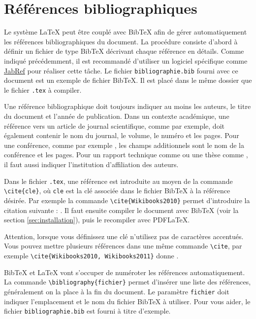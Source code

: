 \documentclass{ceri}
\begin{document}
\section{Références bibliographiques}
\label{sec:biblio}
Le système \LaTeX{} peut être couplé avec BibTeX afin de gérer automatiquement les références bibliographiques du document. La procédure consiste d'abord à définir un fichier de type BibTeX décrivant chaque référence en détails. Comme indiqué précédemment, il est recommandé d'utiliser un logiciel spécifique comme \href{http://jabref.sourceforge.net/}{JabRef} \cite{JabRef2008} pour réaliser cette tâche. Le fichier \texttt{bibliographie.bib} fourni avec ce document est un exemple de fichier BibTeX. Il est placé dans le même dossier que le fichier \texttt{.tex} à compiler.

Une référence bibliographique doit toujours indiquer au moins les auteurs, le titre du document et l'année de publication. Dans un contexte académique, une référence vers un article de journal scientifique, comme \cite{Fortunato2010} par exemple, doit également contenir le nom du journal, le volume, le numéro et les pages. Pour une conférence, comme par exemple \cite{Wei1989}, les champs additionnels sont le nom de la conférence et les pages. Pour un rapport technique comme \cite{Rosvall2009a} ou une thèse comme \cite{Gerbaud2010}, il faut aussi indiquer l'institution d'affiliation des auteurs.

Dans le fichier \texttt{.tex}, une référence est introduite au moyen de la commande \texttt{\textbackslash{}cite\{cle\}}, où \texttt{cle} est la clé associée dans le fichier BibTeX à la référence désirée. Par exemple la commande \texttt{\textbackslash{}cite\{Wikibooks2010\}} permet d'introduire la citation suivante : \cite{Wikibooks2010}. Il faut ensuite compiler le document avec BibTeX (voir la section \ref{sec:installation}), puis le recompiler avec PDFLaTeX.
	
Attention, lorsque vous définissez une clé n'utilisez pas de caractères accentués. Vous pouvez mettre plusieurs références dans une même commande \texttt{\textbackslash{}cite}, par exemple \texttt{\textbackslash{}cite\{Wikibooks2010, Wikibooks2011\}} donne \cite{Wikibooks2010, Wikibooks2011}.
	
BibTeX et \LaTeX{} vont s'occuper de numéroter les références automatiquement. La commande \texttt{\textbackslash{}bibliography\{fichier\}} permet d'insérer une liste des références, généralement on la place à la fin du document. Le paramètre \texttt{fichier} doit indiquer l'emplacement et le nom du fichier BibTeX à utiliser. Pour vous aider, le fichier \texttt{bibliographie.bib} est fourni à titre d'exemple.
	
\end{document}
